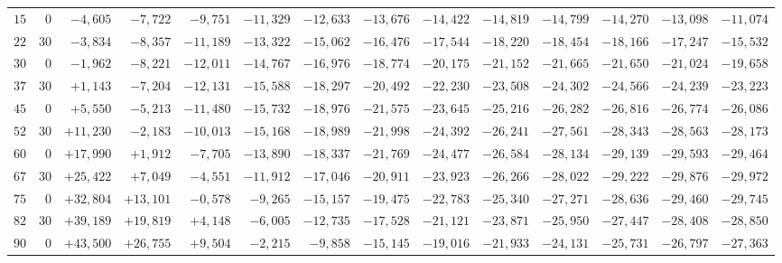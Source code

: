 \begin{landscape}
\begin{longtable}{@{}rr|r|r|r|r|r|r|r|r|r|r|r|r@{}}
\(15\) & \(0\) & \(-4{,}605\) & \(-7{,}722\) & \(-9{,}751\) & \(-11{,}329\) & \(-12{,}633\) & \(-13{,}676\) & \(-14{,}422\) & \(-14{,}819\) & \(-14{,}799\) & \(-14{,}270\) & \(-13{,}098\) & \(-11{,}074\)\\
\(22\) & \(30\) & \(-3{,}834\) & \(-8{,}357\) & \(-11{,}189\) & \(-13{,}322\) & \(-15{,}062\) & \(-16{,}476\) & \(-17{,}544\) & \(-18{,}220\) & \(-18{,}454\) & \(-18{,}166\) & \(-17{,}247\) & \(-15{,}532\)\\[2pt]
\(30\) & \(0\) & \(-1{,}962\) & \(-8{,}221\) & \(-12{,}011\) & \(-14{,}767\) & \(-16{,}976\) & \(-18{,}774\) & \(-20{,}175\) & \(-21{,}152\) & \(-21{,}665\) & \(-21{,}650\) & \(-21{,}024\) & \(-19{,}658\)\\
\(37\) & \(30\) & \(+1{,}143\) & \(-7{,}204\) & \(-12{,}131\) & \(-15{,}588\) & \(-18{,}297\) & \(-20{,}492\) & \(-22{,}230\) & \(-23{,}508\) & \(-24{,}302\) & \(-24{,}566\) & \(-24{,}239\) & \(-23{,}223\)\\
\(45\) & \(0\) & \(+5{,}550\) & \(-5{,}213\) & \(-11{,}480\) & \(-15{,}732\) & \(-18{,}976\) & \(-21{,}575\) & \(-23{,}645\) & \(-25{,}216\) & \(-26{,}282\) & \(-26{,}816\) & \(-26{,}774\) & \(-26{,}086\)\\
\(52\) & \(30\) & \(+11{,}230\) & \(-2{,}183\) & \(-10{,}013\) & \(-15{,}168\) & \(-18{,}989\) & \(-21{,}998\) & \(-24{,}392\) & \(-26{,}241\) & \(-27{,}561\) & \(-28{,}343\) & \(-28{,}563\) & \(-28{,}173\)\\[2pt]
\(60\) & \(0\) & \(+17{,}990\) & \(+1{,}912\) & \(-7{,}705\) & \(-13{,}890\) & \(-18{,}337\) & \(-21{,}769\) & \(-24{,}477\) & \(-26{,}584\) & \(-28{,}134\) & \(-29{,}139\) & \(-29{,}593\) & \(-29{,}464\)\\
\(67\) & \(30\) & \(+25{,}422\) & \(+7{,}049\) & \(-4{,}551\) & \(-11{,}912\) & \(-17{,}046\) & \(-20{,}911\) & \(-23{,}923\) & \(-26{,}266\) & \(-28{,}022\) & \(-29{,}222\) & \(-29{,}876\) & \(-29{,}972\)\\
\(75\) & \(0\) & \(+32{,}804\) & \(+13{,}101\) & \(-0{,}578\) & \(-9{,}265\) & \(-15{,}157\) & \(-19{,}475\) & \(-22{,}783\) & \(-25{,}340\) & \(-27{,}271\) & \(-28{,}636\) & \(-29{,}460\) & \(-29{,}745\)\\
\(82\) & \(30\) & \(+39{,}189\) & \(+19{,}819\) & \(+4{,}148\) & \(-6{,}005\) & \(-12{,}735\) & \(-17{,}528\) & \(-21{,}121\) & \(-23{,}871\) & \(-25{,}950\) & \(-27{,}447\) & \(-28{,}408\) & \(-28{,}850\)\\[2pt]
\(90\) & \(0\) & \(+43{,}500\) & \(+26{,}755\) & \(+9{,}504\) & \(-2{,}215\) & \(-9{,}858\) & \(-15{,}145\) & \(-19{,}016\) & \(-21{,}933\) & \(-24{,}131\) & \(-25{,}731\) & \(-26{,}797\) & \(-27{,}363\)\\

\end{longtable}
\end{landscape}
